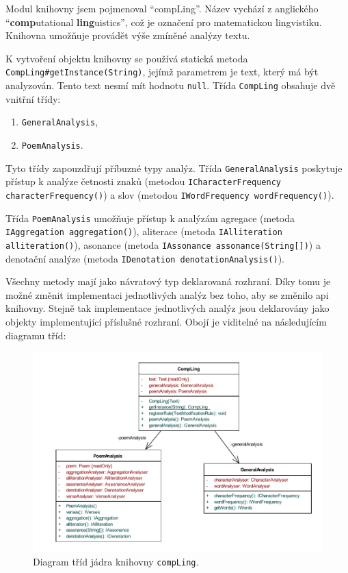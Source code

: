 \documentclass[dp.tex]{subfiles}
\begin{document}
Modul knihovny jsem pojmenoval \enquote{compLing}. Název vychází z anglického \enquote{\textbf{comp}utational \textbf{ling}uistics}, což je označení pro matematickou lingvistiku. Knihovna umožňuje provádět výše zmíněné analýzy textu. 

\sloppy
K vytvoření objektu knihovny se používá statická metoda \texttt{ CompLing\#getInstance(String)}, jejímž parametrem je text, který má být analyzován. Tento text nesmí mít hodnotu \texttt{null}. Třída \texttt{CompLing} obsahuje dvě vnitřní třídy:
\begin{enumerate}
	\item \texttt{GeneralAnalysis},
	\item \texttt{PoemAnalysis}.
\end{enumerate}

Tyto třídy zapouzdřují příbuzné typy analýz. Třída \texttt{GeneralAnalysis} poskytuje přístup k analýze četnosti znaků (metodou \texttt{ICharacterFrequency characterFrequency()}) a slov (metodou \texttt{IWordFrequency wordFrequency()}). 

\sloppy
Třída \texttt{PoemAnalysis} umožňuje přístup k analýzám agregace (metoda \texttt{IAggregation aggregation()}), aliterace (metoda \texttt{IAlliteration alliteration()}), asonance (metoda \texttt{IAssonance assonance(String[])}) a denotační analýze (metoda \texttt{IDenotation denotationAnalysis()}).

Všechny metody mají jako návratový typ deklarovaná rozhraní. Díky tomu je možné změnit implementaci jednotlivých analýz bez toho, aby se změnilo \acrshort{api} knihovny. Stejně tak implementace jednotlivých analýz jsou deklarovány jako objekty implementující příslušné rozhraní. Obojí je viditelné na následujícím diagramu tříd:

\begin{figure}[h!]
	\centering
	\includegraphics[width=\textwidth,keepaspectratio=true]{imgs-60-aplikace/compLing-class-diagram.pdf}
	\caption{Diagram tříd jádra knihovny \texttt{compLing}.}
\end{figure}
\end{document}
